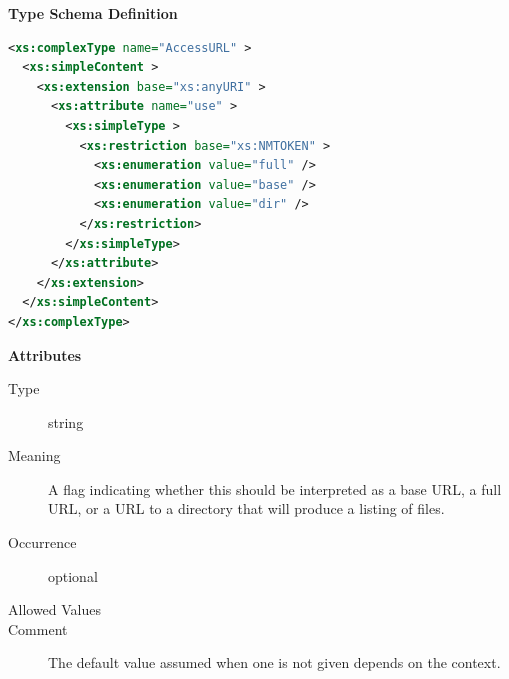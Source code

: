 \documentclass[11pt,a4paper]{ivoa}
\begin{document}
\begin{generated}
\begingroup
        \renewcommand*\descriptionlabel[1]{%
        \hbox to 5.5em{\emph{#1}\hfil}}\vspace{1ex}\noindent\textbf{ Type Schema Definition}

\begin{lstlisting}[language=XML,basicstyle=\footnotesize]
<xs:complexType name="AccessURL" >
  <xs:simpleContent >
    <xs:extension base="xs:anyURI" >
      <xs:attribute name="use" >
        <xs:simpleType >
          <xs:restriction base="xs:NMTOKEN" >
            <xs:enumeration value="full" />
            <xs:enumeration value="base" />
            <xs:enumeration value="dir" />
          </xs:restriction>
        </xs:simpleType>
      </xs:attribute>
    </xs:extension>
  </xs:simpleContent>
</xs:complexType>
\end{lstlisting}

\vspace{0.5ex}\noindent\textbf{ Attributes}

\begingroup\small\begin{bigdescription}
\item[use]
\begin{description}
\item[Type] string
\item[Meaning]
               A flag indicating whether this should be interpreted as a base
               URL, a full URL, or a URL to a directory that will produce a
               listing of files.

\item[Occurrence] optional

\item[Allowed Values]\hfil
{}
\item[Comment]
               The default value assumed when one is not given depends on the
               context.

\end{description}


\end{bigdescription}\endgroup

\endgroup
\end{generated}
\end{document}
